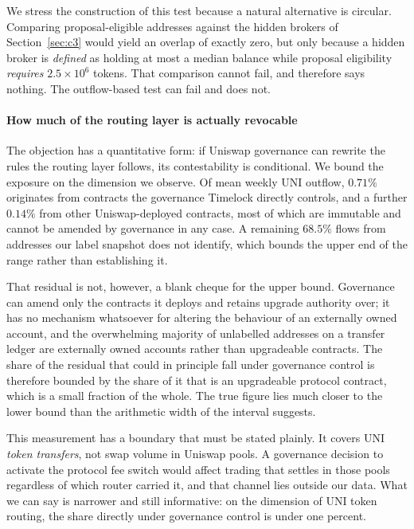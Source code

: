 \documentclass[final,5p,times]{elsarticle}
\begin{document}
We stress the construction of this test because a natural alternative is
circular. Comparing proposal-eligible addresses against the hidden brokers
of Section~\ref{sec:c3} would yield an overlap of exactly zero, but only
because a hidden broker is \emph{defined} as holding at most a median
balance while proposal eligibility \emph{requires} $2.5\times10^6$ tokens.
That comparison cannot fail, and therefore says nothing. The outflow-based
test can fail and does not.

\paragraph{How much of the routing layer is actually revocable}
The objection has a quantitative form: if Uniswap governance can
rewrite the rules the routing layer follows, its contestability is
conditional. We bound the exposure on the dimension we observe. Of mean
weekly UNI outflow, $0.71\%$ originates from contracts the governance
Timelock directly controls, and a further $0.14\%$ from other
Uniswap-deployed contracts, most of which are immutable and cannot be
amended by governance in any case. A remaining $68.5\%$ flows from addresses
our label snapshot does not identify, which bounds the upper end of the range
rather than establishing it.

That residual is not, however, a blank cheque for the upper bound. Governance
can amend only the contracts it deploys and retains upgrade authority over;
it has no mechanism whatsoever for altering the behaviour of an externally
owned account, and the overwhelming majority of unlabelled addresses on a
transfer ledger are externally owned accounts rather than upgradeable
contracts. The share of the residual that could in principle fall under
governance control is therefore bounded by the share of it that is an
upgradeable protocol contract, which is a small fraction of the whole. The
true figure lies much closer to the lower bound than the arithmetic width of
the interval suggests.

This measurement has a boundary that must be stated plainly. It covers UNI
\emph{token transfers}, not swap volume in Uniswap pools. A governance
decision to activate the protocol fee switch would affect trading that
settles in those pools regardless of which router carried it, and that
channel lies outside our data. What we can say is narrower and still
informative: on the dimension of UNI token routing, the share directly under
governance control is under one percent.
\end{document}

